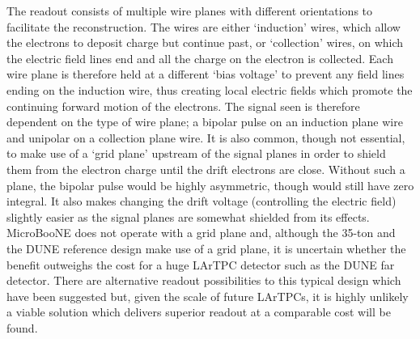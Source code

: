 The readout consists of multiple wire planes with different orientations to facilitate the reconstruction.  The wires are either `induction' wires, which allow the electrons to deposit charge but continue past, or `collection' wires, on which the electric field lines end and all the charge on the electron is collected.  Each wire plane is therefore held at a different `bias voltage' to prevent any field lines ending on the induction wire, thus creating local electric fields which promote the continuing forward motion of the electrons.  The signal seen is therefore dependent on the type of wire plane; a bipolar pulse on an induction plane wire and unipolar on a collection plane wire.  It is also common, though not essential, to make use of a `grid plane' upstream of the signal planes in order to shield them from the electron charge until the drift electrons are close.  Without such a plane, the bipolar pulse would be highly asymmetric, though would still have zero integral.  It also makes changing the drift voltage (controlling the electric field) slightly easier as the signal planes are somewhat shielded from its effects.  MicroBooNE does not operate with a grid plane and, although the 35-ton and the DUNE reference design make use of a grid plane, it is uncertain whether the benefit outweighs the cost for a huge LArTPC detector such as the DUNE far detector.  There are alternative readout possibilities to this typical design which have been suggested but, given the scale of future LArTPCs, it is highly unlikely a viable solution which delivers superior readout at a comparable cost will be found.

